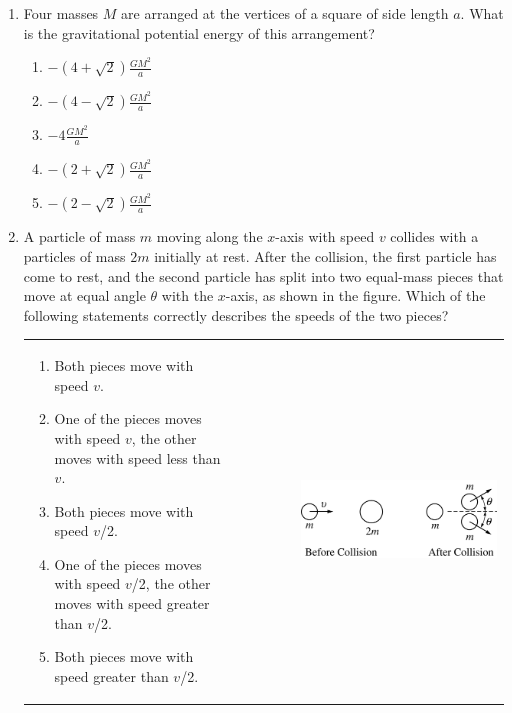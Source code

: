 \documentclass[12pt,letterpaper]{article}
\begin{document}
\begin{enumerate}[resume]
\vfill
\newpage

\item
Four masses $M$ are arranged at the vertices of a square of side length $a$. What is the gravitational potential energy of this arrangement?
\begin{enumerate}
\item $\displaystyle -\left(4+\sqrt{2}\right)\frac{GM^2}{a}$
\item $\displaystyle -\left(4-\sqrt{2}\right)\frac{GM^2}{a}$
\item $\displaystyle -4\frac{GM^2}{a}$
\item $\displaystyle -\left(2+\sqrt{2}\right)\frac{GM^2}{a}$
\item $\displaystyle -\left(2-\sqrt{2}\right)\frac{GM^2}{a}$
\end{enumerate}

\item
A particle of mass $m$ moving along the $x$-axis with speed $v$ collides with a particles of mass $2m$ initially at rest. After the collision, the first particle has come to rest, and the second particle has split into two equal-mass pieces that move at equal angle $\theta$ with the $x$-axis, as shown in the figure. Which of the following statements correctly describes the speeds of the two pieces?

\begin{tabular}{l r}

\begin{minipage}{0.5\textwidth}
\begin{enumerate}
\item Both pieces move with speed $v$.
\item One of the pieces moves with speed $v$, the other moves with speed less than $v$.
\item Both pieces move with speed $v$/2.
\item One of the pieces moves with speed $v$/2, the other moves with speed greater than $v$/2.
\item Both pieces move with speed greater than $v$/2.
\end{enumerate}
\end{minipage} &
\begin{minipage}{0.5\textwidth}
\includegraphics[width=0.75\textwidth,left]{collision.png}
\end{minipage}
\end{tabular}


\end{enumerate}
\end{document}
